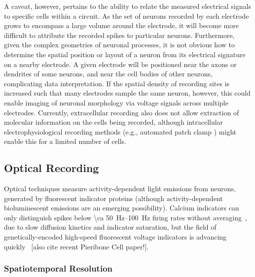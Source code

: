 A caveat, however, pertains to the ability to relate the measured electrical signals to specific cells within a circuit.
As the set of neurons recorded by each electrode grows to encompass a large volume around the electrode, it will become more difficult to attribute the recorded spikes to particular neurons.
Furthermore, given the complex geometries of neuronal processes, it is not obvious how to determine the spatial position or layout of a neuron from its electrical signature on a nearby electrode. A given electrode will be positioned near the axons or dendrites of some neurons, and near the cell bodies of other neurons, complicating data interpretation. If the spatial density of recording sites is increased such that many electrodes sample the same neuron, however, this could enable imaging of neuronal morphology via voltage signals across multiple electrodes. Currently, extracellular recording also does not allow extraction of molecular information on the cells being recorded, although intracellular electrophysiological recording methods (e.g., automated patch clamp \cite{Kodandaramaiah2012}) might enable this for a limited number of cells.

\subsection{Optical Recording}

Optical techniques measure activity-dependent light emissions from neurons, generated by fluorescent indicator proteins (although activity-dependent bioluminescent emissions are an emerging possibility).
Calcium indicators can only distinguish spikes below \SIrange{\ca 50}{100}{\hertz} firing rates without averaging~\cite{Smetters99}, due to slow diffusion kinetics and indicator saturation, but the field of genetically-encoded high-speed fluorescent voltage indicators is advancing quickly~\cite{Barnett2012, Kralj2012, Storace2013} [also cite recent Pieribone Cell paper!].

\subsubsection{Spatiotemporal Resolution}

